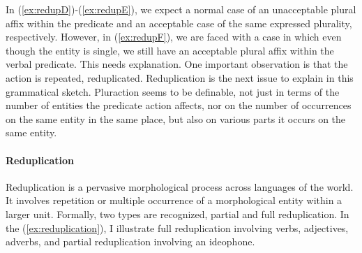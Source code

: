 \ea \label{ex:redup} 
\z\z



In (\ref{ex:redupD})-(\ref{ex:redupE}), we expect a normal case of an unacceptable plural affix within the predicate and
an acceptable case of the same expressed plurality, respectively. However, in (\ref{ex:redupF}), we are
faced with a case in which even though the entity is single, we still have an acceptable plural
affix within the verbal predicate. This needs explanation. One important observation is that
the action is repeated, reduplicated. Reduplication is the next issue to explain in this
grammatical sketch. Pluraction seems to be definable, not just in terms of the number of
entities the predicate action affects, nor on the number of occurrences on the same entity in
the same place, but also on various parts it occurs on the same entity.

\paragraph{Reduplication}
Reduplication is a pervasive morphological process across languages of the world. It
involves repetition or multiple occurrence of a morphological entity within a larger unit.
Formally, two types are recognized, partial and full reduplication. In the (\ref{ex:reduplication}), I illustrate full reduplication involving verbs, adjectives, adverbs, and partial
reduplication involving an ideophone.

